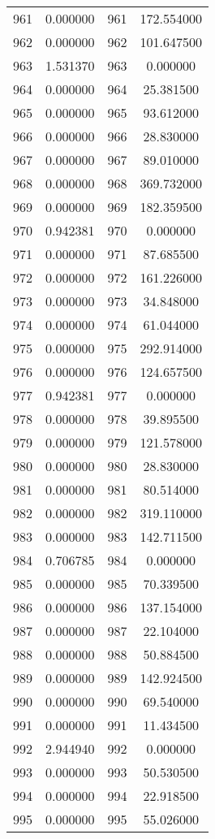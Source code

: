 \documentclass[12pt]{article}
\begin{document}
\begin{longtable}{@{}cccc@{}}
961 & 0.000000 & 961 & 172.554000 \\
962 & 0.000000 & 962 & 101.647500 \\
963 & 1.531370 & 963 & 0.000000 \\
964 & 0.000000 & 964 & 25.381500 \\
965 & 0.000000 & 965 & 93.612000 \\
966 & 0.000000 & 966 & 28.830000 \\
967 & 0.000000 & 967 & 89.010000 \\
968 & 0.000000 & 968 & 369.732000 \\
969 & 0.000000 & 969 & 182.359500 \\
970 & 0.942381 & 970 & 0.000000 \\
971 & 0.000000 & 971 & 87.685500 \\
972 & 0.000000 & 972 & 161.226000 \\
973 & 0.000000 & 973 & 34.848000 \\
974 & 0.000000 & 974 & 61.044000 \\
975 & 0.000000 & 975 & 292.914000 \\
976 & 0.000000 & 976 & 124.657500 \\
977 & 0.942381 & 977 & 0.000000 \\
978 & 0.000000 & 978 & 39.895500 \\
979 & 0.000000 & 979 & 121.578000 \\
980 & 0.000000 & 980 & 28.830000 \\
981 & 0.000000 & 981 & 80.514000 \\
982 & 0.000000 & 982 & 319.110000 \\
983 & 0.000000 & 983 & 142.711500 \\
984 & 0.706785 & 984 & 0.000000 \\
985 & 0.000000 & 985 & 70.339500 \\
986 & 0.000000 & 986 & 137.154000 \\
987 & 0.000000 & 987 & 22.104000 \\
988 & 0.000000 & 988 & 50.884500 \\
989 & 0.000000 & 989 & 142.924500 \\
990 & 0.000000 & 990 & 69.540000 \\
991 & 0.000000 & 991 & 11.434500 \\
992 & 2.944940 & 992 & 0.000000 \\
993 & 0.000000 & 993 & 50.530500 \\
994 & 0.000000 & 994 & 22.918500 \\
995 & 0.000000 & 995 & 55.026000 \\

\end{longtable}
\end{document}
